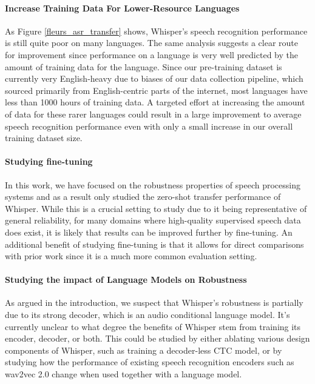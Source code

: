 \documentclass[nohyperref]{article}
\theoremstyle{plain}
\theoremstyle{definition}
\theoremstyle{remark}
\begin{document}
\paragraph{Increase Training Data For Lower-Resource Languages} As Figure \ref{fleurs_asr_transfer} shows, Whisper's speech recognition performance is still quite poor on many languages. The same analysis suggests a clear route for improvement since performance on a language is very well predicted by the amount of training data for the language. Since our pre-training dataset is currently very English-heavy due to biases of our data collection pipeline, which sourced primarily from English-centric parts of the internet, most languages have less than 1000 hours of training data. A targeted effort at increasing the amount of data for these rarer languages could result in a large improvement to average speech recognition performance even with only a small increase in our overall training dataset size.

\paragraph{Studying fine-tuning} In this work, we have focused on the robustness properties of speech processing systems and as a result only studied the zero-shot transfer performance of Whisper. While this is a crucial setting to study due to it being representative of general reliability, for many domains where high-quality supervised speech data does exist, it is likely that results can be improved further by fine-tuning. An additional benefit of studying fine-tuning is that it allows for direct comparisons with prior work since it is a much more common evaluation setting.

\paragraph{Studying the impact of Language Models on Robustness} As argued in the introduction, we suspect that Whisper's robustness is partially due to its strong decoder, which is an audio conditional language model. It's currently unclear to what degree the benefits of Whisper stem from training its encoder, decoder, or both. This could be studied by either ablating various design components of Whisper, such as training a decoder-less CTC model, or by studying how the performance of existing speech recognition encoders such as wav2vec 2.0 change when used together with a language model.

\end{document}

